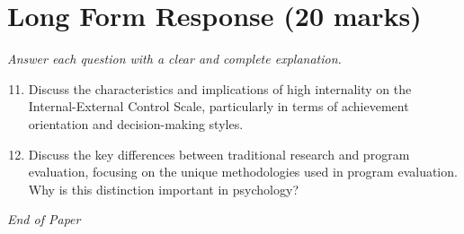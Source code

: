 \documentclass[12pt]{article}
\begin{document}
\section*{Long Form Response (20 marks)}
\textit{Answer each question with a clear and complete explanation.}
\begin{enumerate}[label=\arabic*.]
\setcounter{enumi}{10}
\item Discuss the characteristics and implications of high internality on the Internal-External Control Scale, particularly in terms of achievement orientation and decision-making styles.
\item Discuss the key differences between traditional research and program evaluation, focusing on the unique methodologies used in program evaluation. Why is this distinction important in psychology?
\end{enumerate}

\vfill
\noindent\textit{End of Paper}
\end{document}
